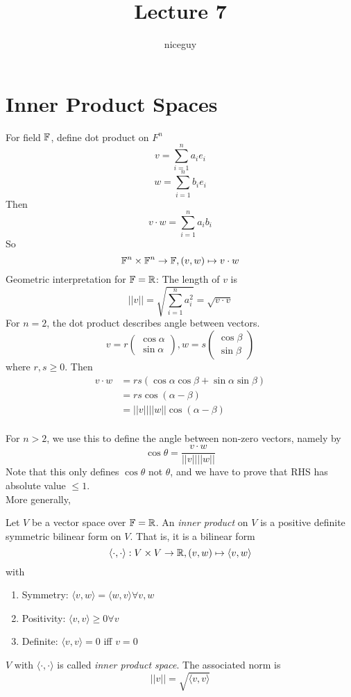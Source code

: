 \documentclass[12pt]{article}
\author{niceguy}
\title{Lecture 7}
\begin{document}
\maketitle

\section{Inner Product Spaces}
For field $\mathbb{F}$, define dot product on $F^n$
$$v=\sum_{i=1}^n a_ie_i$$
$$w = \sum_{i=1}^n b_ie_i$$
Then
$$v\cdot w = \sum_{i=1}^n a_ib_i$$
So
$$\mathbb{F}^n\times\mathbb{F}^n\rightarrow\mathbb{F},(v,w)\mapsto v\cdot w$$
Geometric interpretation for $\mathbb{F}=\mathbb{R}$:
The length of $v$ is
$$||v||=\sqrt{\sum_{i=1}^n a_i^2}=\sqrt{v\cdot v}$$
For $n=2$, the dot product describes angle between vectors.
$$v=r\begin{pmatrix}\cos\alpha \\ \sin\alpha\end{pmatrix},w=s\begin{pmatrix}\cos\beta \\ \sin\beta\end{pmatrix}$$
where $r,s\geq 0$. Then
\begin{align*}
	v\cdot w &= rs(\cos\alpha\cos\beta + \sin\alpha\sin\beta) \\
		 &= rs\cos(\alpha-\beta) \\
		 &= ||v|| ||w||\cos(\alpha-\beta) \\
\end{align*}

For $n>2$, we use this to define the angle between non-zero vectors, namely by
$$\cos\theta = \frac{v\cdot w}{||v|| ||w||}$$
Note that this only defines $\cos\theta$ not $\theta$, and we have to prove that RHS has absolute value $\leq 1$. \\

More generally,

\begin{defn}
	Let $V$ be a vector space over $\mathbb{F}=\mathbb{R}$. An \emph{inner product} on $V$ is a positive definite symmetric bilinear form on $V$. That is, it is a bilinear form
	$$\langle\cdot,\cdot\rangle: V\times V\rightarrow \mathbb{R}, (v,w)\mapsto \langle v,w \rangle$$
	with
	\begin{enumerate}
		\item Symmetry: $\langle v,w \rangle = \langle w,v \rangle \forall v,w$
		\item Positivity: $\langle v,v \rangle \geq 0 \forall v$
		\item Definite: $\langle v,v \rangle = 0$ iff $v=0$
	\end{enumerate}
	$V$ with $\langle\cdot,\cdot\rangle$ is called \emph{inner product space}. The associated norm is
	$$||v|| = \sqrt{\langle v,v \rangle}$$
\end{defn}
\end{document}
